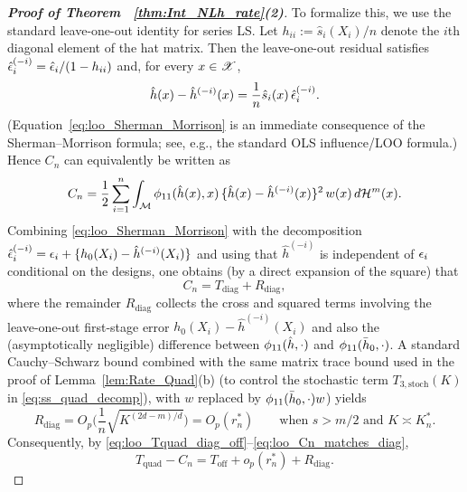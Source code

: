 \documentclass[12pt,american]{article}
\newcommand{\cH}{\mathcal{H}}
\theoremstyle{definition}
\theoremstyle{plain}
\theoremstyle{definition}
\theoremstyle{plain}
\theoremstyle{plain}
\theoremstyle{plain}
\theoremstyle{plain}
\theoremstyle{plain}
\begin{document}
\begin{proof}[\textbf{Proof of Theorem ~\ref{thm:Int_NLh_rate}(2)}]
To formalize this, we use the standard leave-one-out identity for series LS.
Let $h_{ii}:=\hat s_i(X_i)/n$ denote the $i$th diagonal element of the hat matrix.
Then the leave-one-out residual satisfies $\hat{\epsilon}_i^{(-i)}=\hat{\epsilon}_i/(1-h_{ii})$ and, for every $x\in\mathscr{X}$,
\begin{equation}\label{eq:loo_Sherman_Morrison}
\hat h(x)-\hat h^{(-i)}(x)=\frac{1}{n}\hat s_i(x)\,\hat{\epsilon}_i^{(-i)}.
\end{equation}
(Equation~\eqref{eq:loo_Sherman_Morrison} is an immediate consequence of the Sherman--Morrison formula; see, e.g., the standard OLS influence/LOO formula.)
Hence $C_n$ can equivalently be written as
\begin{equation}\label{eq:loo_Cn_alt}
C_n=\frac12\sum_{i=1}^n\int_{\cM}\phi_{11}(\hat h(x),x)\,\{\hat h(x)-\hat h^{(-i)}(x)\}^2\,w(x)\,d\cH^m(x).
\end{equation}
Combining \eqref{eq:loo_Sherman_Morrison} with the decomposition $\hat{\epsilon}_i^{(-i)}=\epsilon_i+\{h_0(X_i)-\hat h^{(-i)}(X_i)\}$ and using that $\hat h^{(-i)}$ is independent of $\epsilon_i$ conditional on the designs,
one obtains (by a direct expansion of the square) that
\begin{equation}\label{eq:loo_Cn_matches_diag}
C_n=T_{\text{diag}}+R_{\text{diag}},
\end{equation}
where the remainder $R_{\text{diag}}$ collects the cross and squared terms involving the leave-one-out first-stage error $h_0(X_i)-\hat h^{(-i)}(X_i)$ and also the (asymptotically negligible) difference between $\phi_{11}(\hat h,\cdot)$ and $\phi_{11}(\bar h_0,\cdot)$.
A standard Cauchy--Schwarz bound combined with the same matrix trace bound used in the proof of Lemma~\ref{lem:Rate_Quad}(b) (to control the stochastic term $T_{3,\text{stoch}}(K)$ in \eqref{eq:ss_quad_decomp}), with $w$ replaced by $\phi_{11}(\bar h_0,\cdot)w$) yields
\begin{equation}\label{eq:loo_Rdiag_rate}
R_{\text{diag}}=O_p\Big(\frac{1}{n}\sqrt{K^{(2d-m)/d}}\Big)=O_p(r_n^*)\qquad\text{when $s>m/2$ and $K\asymp K_n^*$.}
\end{equation}
Consequently, by \eqref{eq:loo_Tquad_diag_off}--\eqref{eq:loo_Cn_matches_diag},
\begin{equation}\label{eq:loo_Tquad_minus_Cn}
T_{\text{quad}}-C_n
= T_{\text{off}}+o_p(r_n^*)+R_{\text{diag}}.
\end{equation}


\end{proof}
\end{document}

